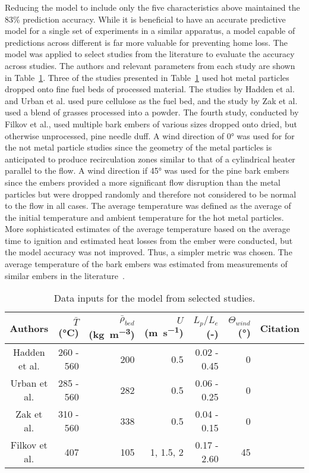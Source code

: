     Reducing the model to include only the five characteristics above maintained the 83\% prediction accuracy. While it is beneficial to have an accurate predictive model for a single set of experiments in a similar apparatus, a model capable of predictions across different is far more valuable for preventing home loss. The model was applied to select studies from the literature to evaluate the accuracy across studies. The authors and relevant parameters from each study are shown in Table~\ref{tab:otherStudies}. Three of the studies presented in Table~\ref{tab:otherStudies} used hot metal particles dropped onto fine fuel beds of processed material. The studies by Hadden et al. and Urban et al. used pure cellulose as the fuel bed, and the study by Zak et al. used a blend of grasses processed into a powder. The fourth study, conducted by Filkov et al., used multiple bark embers of various sizes dropped onto dried, but otherwise unprocessed, pine needle duff. A wind direction of 0\si{\degree} was used for for the not metal particle studies since the geometry of the metal particles is anticipated to produce recirculation zones similar to that of a cylindrical heater parallel to the flow. A wind direction if 45\si{\degree} was used for the pine bark embers since the embers provided a more significant flow disruption than the metal particles but were dropped randomly and therefore not considered to be normal to the flow in all cases. The average temperature was defined as the average of the initial temperature and ambient temperature for the hot metal particles. More sophisticated estimates of the average temperature based on the average time to ignition and estimated heat losses from the ember were conducted, but the model accuracy was not improved. Thus, a simpler metric was chosen. The average temperature of the bark embers was estimated from measurements of similar embers in the literature~\cite{Fateev2017a, Matvienko2018}.
        \begin{table}[hbpt]
            \centering
            \caption{Data inputs for the model from selected studies.}
            \begin{tabular}{crrrrrc}
                Authors & $\bar{T}$ (\si{\celsius}) &  $\bar{\rho}_{bed}$ (\si{\kilo\gram\per\cubic\meter})& $U$ (\si{\meter\per\second}) & $L_{p}/L_{e}$ (-)& $\Theta_{wind}$ (\si{\degree}) & Citation\\
                \hline
                 Hadden et al. & 260 - 560 & 200 & 0.5       & 0.02 - 0.45 & 0  & \cite{Hadden2011}\\
                 Urban et al.  & 285 - 560 & 282 & 0.5       & 0.06 - 0.25 & 0  & \cite{Urban2018}\\
                 Zak et al.    & 310 - 560 & 338 & 0.5       & 0.04 - 0.15 & 0  & \cite{Zak2014} \\
                 Filkov et al. & 407       & 105 & 1, 1.5, 2 & 0.17 - 2.60 & 45 & \cite{Filkov2016}
            \end{tabular}
            \label{tab:otherStudies}
        \end{table}
